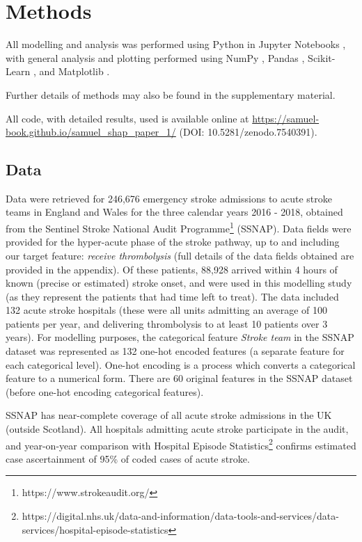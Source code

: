 \renewcommand{\thefootnote}{\alph{footnote}} %

\section{Methods}

All modelling and analysis was performed using Python in Jupyter Notebooks \cite{kluyver_jupyter_2016}, with general analysis and plotting performed using NumPy \cite{harris_array_2020}, Pandas \cite{mckinney-proc-scipy-2010}, Scikit-Learn  \cite{pedregosa_scikit-learn_2011}, and Matplotlib \cite{hunter_matplotlib_2007}. 

Further details of methods may also be found in the supplementary material. 

All code, with detailed results, used is available online at \url{https://samuel-book.github.io/samuel_shap_paper_1/} (DOI: 10.5281/zenodo.7540391). 

\subsection{Data}

Data were retrieved for 246,676 emergency stroke admissions to acute stroke teams in England and Wales for the three calendar years 2016 - 2018, obtained from the Sentinel Stroke National Audit Programme\footnote{https://www.strokeaudit.org/} (SSNAP). Data fields were provided for the hyper-acute phase of the stroke pathway, up to and including our target feature: \emph{receive thrombolysis} (full details of the data fields obtained are provided in the appendix). Of these patients, 88,928 arrived within 4 hours of known (precise or estimated) stroke onset, and were used in this modelling study (as they represent the patients that had time left to treat). The data included 132 acute stroke hospitals (these were all units admitting an average of 100 patients per year, and delivering thrombolysis to at least 10 patients over 3 years). For modelling purposes, the categorical feature \emph{Stroke team} in the SSNAP dataset was represented as 132 one-hot encoded features (a separate feature for each categorical level). One-hot encoding is a process which converts a categorical feature to a numerical form. There are 60 original features in the SSNAP dataset (before one-hot encoding categorical features).

 SSNAP has near-complete coverage of all acute stroke admissions in the UK (outside Scotland). All hospitals admitting acute stroke participate in the audit, and year-on-year comparison with Hospital Episode Statistics\footnote{https://digital.nhs.uk/data-and-information/data-tools-and-services/data-services/hospital-episode-statistics} confirms estimated case ascertainment of 95\% of coded cases of acute stroke.

